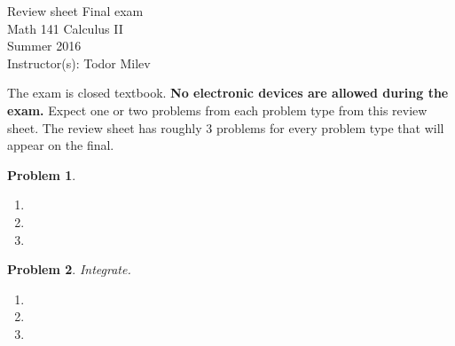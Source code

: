 \documentclass{article}
\renewcommand{\fcProblemRef}{\theproblem.\theenumi}
\newtheorem{problem}{Problem}
\begin{document}
\begin{center}
\Large
Review sheet Final exam \\ Math 141 Calculus II \\ \normalsize Summer 2016 \\ Instructor(s): Todor Milev
\end{center}



\noindent The exam is closed textbook. \textbf{No electronic devices are allowed during the exam. } Expect one or two problems from each problem type from this review sheet. The review sheet has roughly 3 problems for every problem type that will appear on the final.


\begin{problem}
\begin{enumerate}[ref={\fcProblemRef}]
\item 
\item 
\item 
\end{enumerate}
\end{problem}






\begin{problem}Integrate.
\begin{enumerate}
\item 
\item 
\item 
\end{enumerate}
\end{problem}
\end{document}
